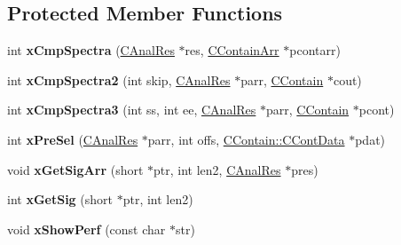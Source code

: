 \subsection*{Protected Member Functions}
\begin{DoxyCompactItemize}
\item 
\hypertarget{class_cx_recog_a2483e244f838e5d9c9ea028829d0cc4d}{int {\bfseries x\-Cmp\-Spectra} (\hyperlink{class_c_anal_res}{C\-Anal\-Res} $\ast$res, \hyperlink{class_c_contain_arr}{C\-Contain\-Arr} $\ast$pcontarr)}\label{class_cx_recog_a2483e244f838e5d9c9ea028829d0cc4d}

\item 
\hypertarget{class_cx_recog_a301bdf927f05890f18c4740a98f994fe}{int {\bfseries x\-Cmp\-Spectra2} (int skip, \hyperlink{class_c_anal_res}{C\-Anal\-Res} $\ast$parr, \hyperlink{class_c_contain}{C\-Contain} $\ast$cout)}\label{class_cx_recog_a301bdf927f05890f18c4740a98f994fe}

\item 
\hypertarget{class_cx_recog_a1fc01b6c3b8005e3d3040db570af4344}{int {\bfseries x\-Cmp\-Spectra3} (int ss, int ee, \hyperlink{class_c_anal_res}{C\-Anal\-Res} $\ast$parr, \hyperlink{class_c_contain}{C\-Contain} $\ast$pcont)}\label{class_cx_recog_a1fc01b6c3b8005e3d3040db570af4344}

\item 
\hypertarget{class_cx_recog_ad997e3889d909c8ae5a1b0095af79b73}{int {\bfseries x\-Pre\-Sel} (\hyperlink{class_c_anal_res}{C\-Anal\-Res} $\ast$parr, int offs, \hyperlink{class_c_contain_1_1_c_cont_data}{C\-Contain\-::\-C\-Cont\-Data} $\ast$pdat)}\label{class_cx_recog_ad997e3889d909c8ae5a1b0095af79b73}

\item 
\hypertarget{class_cx_recog_a2f0a96f9b8f8dc24569bbfc3cac6ec5e}{void {\bfseries x\-Get\-Sig\-Arr} (short $\ast$ptr, int len2, \hyperlink{class_c_anal_res}{C\-Anal\-Res} $\ast$pres)}\label{class_cx_recog_a2f0a96f9b8f8dc24569bbfc3cac6ec5e}

\item 
\hypertarget{class_cx_recog_a882ce5f3b7b7e3988b1a602fa1efb0c0}{int {\bfseries x\-Get\-Sig} (short $\ast$ptr, int len2)}\label{class_cx_recog_a882ce5f3b7b7e3988b1a602fa1efb0c0}

\item 
\hypertarget{class_cx_recog_a5f5d7f4f8b13373da8d23ca0fa63cccf}{void {\bfseries x\-Show\-Perf} (const char $\ast$str)}\label{class_cx_recog_a5f5d7f4f8b13373da8d23ca0fa63cccf}

\end{DoxyCompactItemize}
